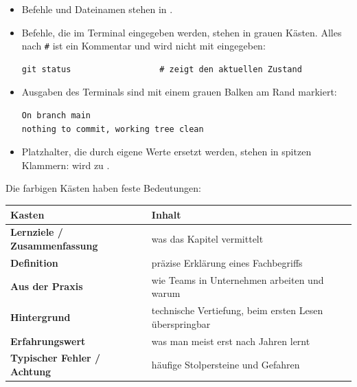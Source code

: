 \begin{itemize}
  \item Befehle und Dateinamen stehen in .
  \item Befehle, die im Terminal eingegeben werden, stehen in grauen Kästen.
        Alles nach \texttt{\#} ist ein Kommentar und wird nicht mit eingegeben:
\begin{lstlisting}[style=befehle]
git status                  # zeigt den aktuellen Zustand
\end{lstlisting}
  \item Ausgaben des Terminals sind mit einem grauen Balken am Rand markiert:
\begin{lstlisting}[style=ausgabe]
On branch main
nothing to commit, working tree clean
\end{lstlisting}
  \item Platzhalter, die durch eigene Werte ersetzt werden, stehen in spitzen Klammern:
         wird zu .
\end{itemize}

Die farbigen Kästen haben feste Bedeutungen:

\begin{center}
\renewcommand{\arraystretch}{1.3}
\begin{tabularx}{\linewidth}{@{}l>{\raggedright\arraybackslash}X@{}}
  \toprule
  \textbf{Kasten} & \textbf{Inhalt} \\
  \midrule
  {\color{hsluBlau}\textbf{Lernziele / Zusammenfassung}} & was das Kapitel vermittelt \\
  {\color{defFarbe}\textbf{Definition}}                 & präzise Erklärung eines Fachbegriffs \\
  {\color{bspFarbe}\textbf{Aus der Praxis}}             & wie Teams in Unternehmen arbeiten und warum \\
  {\color{gray!65!black}\textbf{Hintergrund}}           & technische Vertiefung, beim ersten Lesen überspringbar \\
  {\color{merkFarbe}\textbf{Erfahrungswert}}            & was man meist erst nach Jahren lernt \\
  {\color{pruefFarbe}\textbf{Typischer Fehler / Achtung}} & häufige Stolpersteine und Gefahren \\
  \bottomrule
\end{tabularx}
\end{center}
